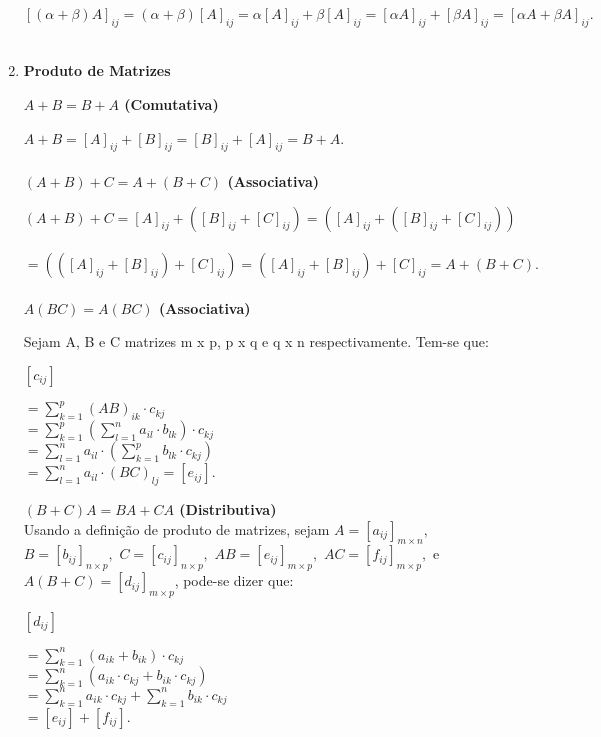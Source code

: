 \documentclass[a4paper, 12pt]{article}
\begin{document}
\begin{enumerate}
$$
[(\alpha + \beta) A]_{ij}
= (\alpha + \beta)[A]_{ij}
= \alpha [A]_{ij} + \beta [A]_{ij} 
= [ \alpha A]_{ij} + [\beta A]_{ij}
= [ \alpha A + \beta A]_{ij}.
$$ \\



\item \textbf{Produto de Matrizes}

\textbf{$A + B = B + A$ (Comutativa)}

$A + B = [A]_{ij} + [B]_{ij} = [B]_{ij} + [A]_{ij} = B + A$. \\ \\


\textbf{$(A + B) + C = A + (B + C)$ (Associativa)}

$$
(A + B) + C 
= [A]_{ij} + ([B]_{ij} + [C]_{ij})
= ([A]_{ij} + ([B]_{ij} + [C]_{ij})) $$ \ $$
= (([A]_{ij} + [B]_{ij}) + [C]_{ij})
= ([A]_{ij} + [B]_{ij}) + [C]_{ij}
= A + (B + C).
$$ \\


\textbf{$A(BC) = A(BC)$ (Associativa)}

Sejam A, B e C matrizes m x p, p x q e q x n respectivamente. Tem-se que:

\begin{multicols}{2}
\begin{flushright}
$
[c_{ij}]
$
\columnbreak
\end{flushright}
\begin{flushleft}
$ = \sum\limits_{k=1}^{p} (AB)_{ik} \cdot c_{kj}$ \\
$ = \sum\limits_{k=1}^{p} (\sum\limits_{l=1}^{n} a_{il} \cdot b_{lk}) \cdot c_{kj}$ \\
$ = \sum\limits_{l=1}^{n} a_{il} \cdot (\sum\limits_{k=1}^{p} b_{lk} \cdot c_{kj})$ \\
$ = \sum\limits_{l=1}^{n} a_{il} \cdot (BC)_{lj} = [e_{ij}]$. \\
\end{flushleft}
\end{multicols}

\textbf{$(B + C)A = BA + CA$ (Distributiva)} \\

Usando a definição de produto de matrizes, sejam
$ A = [a_{ij}]_{m \times n}, $ 
$ B = [b_{ij}]_{n \times p}, $ 
$ C = [c_{ij}]_{n \times p}, $ 
$ AB = [e_{ij}]_{m \times p}, $ 
$ AC = [f_{ij}]_{m \times p}, $ 
e $ A(B+C) = [d_{ij}]_{m \times p} $, pode-se dizer que: 

\begin{multicols}{2}
\begin{flushright}
$
[d_{ij}]
$
\columnbreak
\end{flushright}
\begin{flushleft}
$ = \sum\limits_{k=1}^{n} (a_{ik} + b_{ik}) \cdot c_{kj}$ \\
$ = \sum\limits_{k=1}^{n} (a_{ik} \cdot c_{kj} + b_{ik} \cdot c_{kj})$ \\
$ = \sum\limits_{k=1}^{n} a_{ik} \cdot c_{kj} + \sum\limits_{k=1}^{n} b_{ik} \cdot c_{kj}$ \\
$ = [e_{ij}] + [f_{ij}] $.


\end{flushleft}
\end{multicols}
\end{enumerate}
\end{document}
